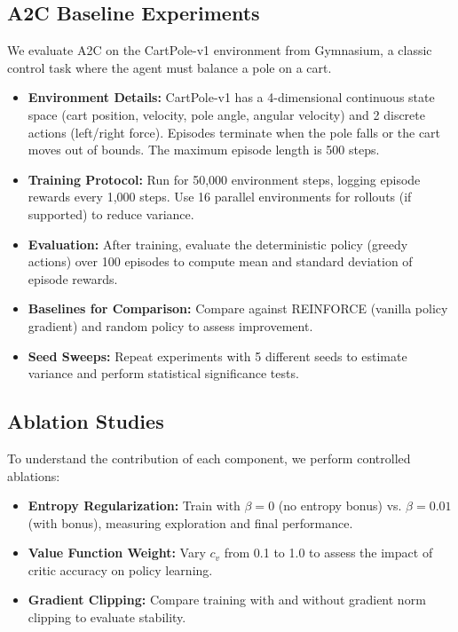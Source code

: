\documentclass[11pt]{article}
\begin{document}
\subsection{A2C Baseline Experiments}
We evaluate A2C on the CartPole-v1 environment from Gymnasium, a classic control task where the agent must balance a pole on a cart.

\begin{itemize}
  \item \textbf{Environment Details:} CartPole-v1 has a 4-dimensional continuous state space (cart position, velocity, pole angle, angular velocity) and 2 discrete actions (left/right force). Episodes terminate when the pole falls or the cart moves out of bounds. The maximum episode length is 500 steps.
  \item \textbf{Training Protocol:} Run for 50,000 environment steps, logging episode rewards every 1,000 steps. Use 16 parallel environments for rollouts (if supported) to reduce variance.
  \item \textbf{Evaluation:} After training, evaluate the deterministic policy (greedy actions) over 100 episodes to compute mean and standard deviation of episode rewards.
  \item \textbf{Baselines for Comparison:} Compare against REINFORCE (vanilla policy gradient) and random policy to assess improvement.
  \item \textbf{Seed Sweeps:} Repeat experiments with 5 different seeds to estimate variance and perform statistical significance tests.
\end{itemize}

\subsection{Ablation Studies}
To understand the contribution of each component, we perform controlled ablations:

\begin{itemize}
  \item \textbf{Entropy Regularization:} Train with $\beta = 0$ (no entropy bonus) vs. $\beta = 0.01$ (with bonus), measuring exploration and final performance.
  \item \textbf{Value Function Weight:} Vary $c_v$ from 0.1 to 1.0 to assess the impact of critic accuracy on policy learning.
  \item \textbf{Gradient Clipping:} Compare training with and without gradient norm clipping to evaluate stability.
\end{itemize}
\end{document}
